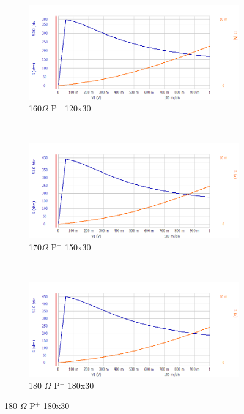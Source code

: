 \documentclass[letter,12pt]{article}
\begin{document}
			\begin{figure}[h!]
				\centering
				\begin{subfigure}[b]{.45\textwidth}
					\includegraphics[width=\textwidth]{./Images/Probe_Test/R_PPlus_120x30.png}
					\caption{160$\Omega$ P$^+$ 120x30}
				\end{subfigure}
				~
				\begin{subfigure}[b]{.45\textwidth}
					\includegraphics[width=\textwidth]{./Images/Probe_Test/R_PPlus_150x30.png}
					\caption{170$\Omega$ P$^+$ 150x30}
				\end{subfigure}
				~
				\begin{subfigure}[b]{.45\textwidth}
					\includegraphics[width=\textwidth]{./Images/Probe_Test/R_PPlus_180x30.png}
					\caption{180 $\Omega$ P$^+$ 180x30}
				\end{subfigure}

\end{figure}
\end{document}
